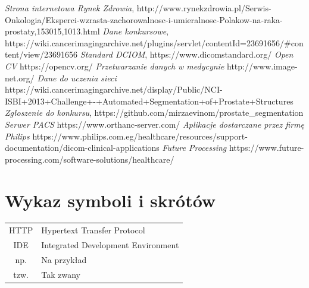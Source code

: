 \documentclass[a4paper,11pt,twoside]{report}
\theoremstyle{definition}
\begin{document}

\begin{thebibliography}{20}%

 \emph{Strona internetowa Rynek Zdrowia}, http://www.rynekzdrowia.pl/Serwis-Onkologia/Eksperci-wzrasta-zachorowalnosc-i-umieralnosc-Polakow-na-raka-prostaty,153015,1013.html
 \emph{Dane konkursowe}, https://wiki.cancerimagingarchive.net/plugins/servlet/contentId=23691656/\#content/view/23691656
 \emph {Standard DCIOM}, https://www.dicomstandard.org/
 \emph {Open CV} https://opencv.org/
 \emph {Przetwarzanie danych w medycynie} http://www.image-net.org/
 \emph {Dane do uczenia sieci }https://wiki.cancerimagingarchive.net/display/Public/NCI-ISBI+2013+Challenge+-+Automated+Segmentation+of+Prostate+Structures
 \emph{Zgłoszenie do konkursu}, https://github.com/mirzaevinom/prostate\_segmentation
 \emph{Serwer PACS} https://www.orthanc-server.com/
 \emph{Aplikacje dostarczane przez firmę Philips} https://www.philips.com.eg/healthcare/resources/support-documentation/dicom-clinical-applications
 \emph{Future Processing} https://www.future-processing.com/software-solutions/healthcare/
\end{thebibliography}
\thispagestyle{empty}


\chapter*{Wykaz symboli i skrótów}

\begin{tabular}{cl}
HTTP & Hypertext Transfer Protocol \\
IDE & Integrated Development Environment \\
np. & Na przykład \\
tzw. & Tak zwany \\
\end{tabular}
\thispagestyle{empty}
\end{document}
